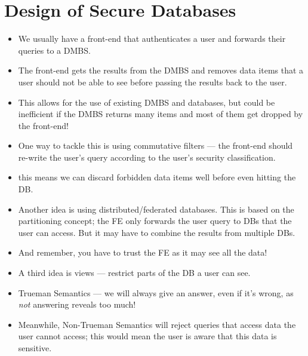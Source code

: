 \documentclass{article}
\begin{document}
\section{Design of Secure Databases}
\begin{itemize}
    \item We usually have a front-end that authenticates a user and forwards their queries to a DMBS.
    \item The front-end gets the results from the DMBS and removes data items that a user should not be able to see before passing the results back to the user.
    \item This allows for the use of existing DMBS and databases, but could be inefficient if the DMBS returns many items and most of them get dropped by the front-end!
    \item One way to tackle this is using commutative filters --- the front-end should re-write the user's query according to the user's security classification.
    \item this means we can discard forbidden data items well before even hitting the DB.
    \item Another idea is using distributed/federated databases.  This is based on the partitioning concept; the FE only forwards the user query to DBs that the user can access.  But it may have to combine the results from multiple DBs.
    \item And remember, you have to trust the FE as it may see all the data!
    \item A third idea is views --- restrict parts of the DB a user can see.
    \item Trueman Semantics --- we will always give an answer, even if it's wrong, as \emph{not} answering reveals too much!
    \item Meanwhile, Non-Trueman Semantics will reject queries that access data the user cannot access; this would mean the user is aware that this data is sensitive.
\end{itemize}
\end{document}
